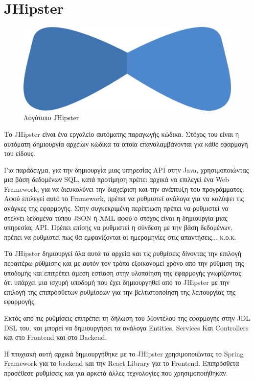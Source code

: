 \section{JHipster}

\begin{figure}[h]
  \centering
  \includegraphics[]{Chapters/3 - Technologies/Images/jhipster-logo.png}
  \caption{Λογότυπο JHipster}
  \label{fig:jhipster-logo}
\end{figure}

Το JHipster είναι ένα εργαλείο αυτόματης παραγωγής κώδικα. Στόχος του είναι η αυτόματη δημιουργία αρχείων κώδικα τα οποία επαναλαμβάνονται για κάθε εφαρμογή του είδους.

Για παράδειγμα, για την δημιουργία μιας υπηρεσίας API στην Java, χρησιμοποιώντας μια βάση δεδομένων SQL, κατά προτίμηση πρέπει αρχικά να επιλεγεί ένα Web Framework, για να διευκολύνει την διαχείριση και την ανάπτυξη του προγράμματος. Αφού επιλεγεί αυτό το Framework, πρέπει να ρυθμιστεί ανάλογα για να καλύψει τις ανάγκες της εφαρμογής. Στην συγκεκριμένη περίπτωση πρέπει να ρυθμιστεί να στέλνει δεδομένα τύπου JSON ή XML αφού ο στόχος είναι η δημιουργία μιας υπηρεσίας API. Πρέπει επίσης να ρυθμιστεί η σύνδεση με την βάση δεδομένων, πρέπει να ρυθμιστεί πως θα εμφανίζονται οι ημερομηνίες στις απαντήσεις... κ.ο.κ. 

Το JHipster δημιουργεί όλα αυτά τα αρχεία και τις ρυθμίσεις δίνοντας την επιλογή περαιτέρω ρύθμισης και με αυτόν τον τρόπο εξοικονομεί χρόνο από την ρύθμιση της υποδομής και επιτρέπει άμεση εστίαση στην υλοποίηση της εφαρμογής γνωρίζοντας ότι υπάρχει μια ισχυρή υποδομή που έχει δημιουργηθεί από το JHipster με την επιλογή της επιπρόσθετων ρυθμίσεων για την βελτιστοποίηση της λειτουργίας της εφαρμογής.

Εκτός από τις ρυθμίσεις επιτρέπει τη δήλωση του Μοντέλου της εφαρμογής στην JDL DSL του, και μπορεί να δημιουργήσει τα ανάλογα Entities, Services Και Controllers και στο Frontend και στο Backend.

Η πτυχιακή αυτή αρχικά δημιουργήθηκε με το JHipster χρησιμοποιώντας το Spring Framework για το backend και την React Library για το Frontend. Επιπρόσθετα προσέθεσε ρυθμίσεις και για αρκετά άλλες τεχνολογίες που χρησιμοποιήθηκαν.

